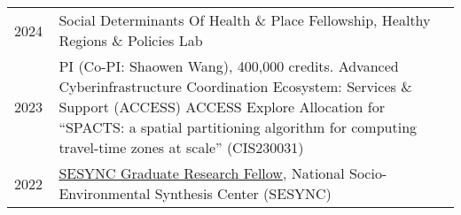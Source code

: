\documentclass{acmcv}
\begin{document}

\begin{longtable}{p{0.1\linewidth} p{0.9\linewidth}}
    2024 & Social Determinants Of Health \& Place Fellowship, Healthy Regions \& Policies Lab \\

    2023 & PI (Co-PI: Shaowen Wang), 400,000 credits. Advanced Cyberinfrastructure Coordination Ecosystem: Services \& Support (ACCESS) \newline ACCESS Explore Allocation for “SPACTS: a spatial partitioning algorithm for computing travel-time zones at scale” (CIS230031) \\


    2022 & \href{https://www.sesync.org/project/graduate-pursuits-request-for-proposals/financial-opacity-and-challenges-to-forest}{SESYNC Graduate Research Fellow}, National Socio-Environmental Synthesis Center (SESYNC)\\

\end{longtable}


\end{document}
